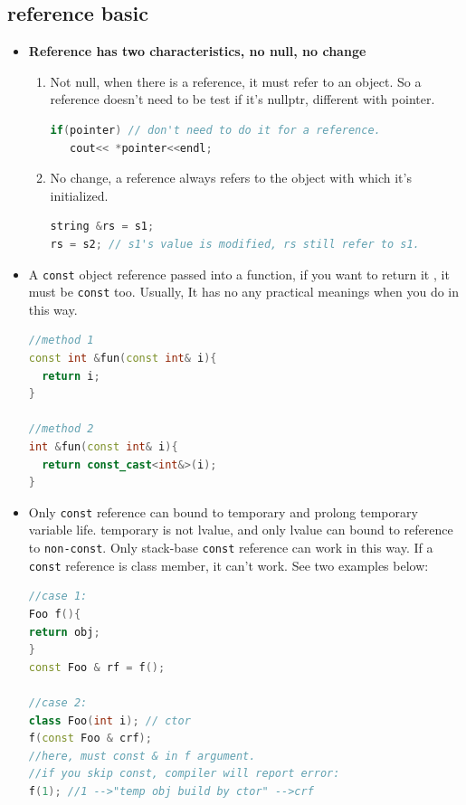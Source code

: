 \documentclass[a4paper,12pt,twoside]{book}
\begin{document}
\subsection{reference basic}
\begin{itemize}
\item \textbf{Reference has two characteristics, no null, no change}
\begin{enumerate}
\item Not null, when there is a reference, it must refer to an object. So a reference doesn't need to be test if it's nullptr, different with pointer.
\begin{lstlisting}[frame=single, language=c++]
if(pointer) // don't need to do it for a reference.
   cout<< *pointer<<endl;
\end{lstlisting}

\item No change, a reference always refers to the object with which it's initialized.
\begin{lstlisting}[frame=single, language=c++]
string &rs = s1;
rs = s2; // s1's value is modified, rs still refer to s1.
\end{lstlisting}
\end{enumerate}


\item A \texttt{const} object reference passed into a function, if you want to return it , it must be \texttt{const} too. Usually, It has no any practical meanings when you do in this way. 
\begin{lstlisting}[frame=single, language=c++]
//method 1
const int &fun(const int& i){
  return i;
}

//method 2
int &fun(const int& i){
  return const_cast<int&>(i);
}
\end{lstlisting}

\item Only \texttt{const} reference can bound to temporary and prolong temporary variable life. temporary is not lvalue, and only lvalue can bound to reference to \texttt{non-const}. Only stack-base \texttt{const} reference can work in this way. If a \texttt{const} reference is class member, it can't work.  See two examples below:

\begin{lstlisting}[frame=single, language=c++]
//case 1:
Foo f(){
return obj;
}
const Foo & rf = f();

//case 2:
class Foo(int i); // ctor
f(const Foo & crf);
//here, must const & in f argument.
//if you skip const, compiler will report error:
f(1); //1 -->"temp obj build by ctor" -->crf
\end{lstlisting}


\end{itemize}
\end{document}
